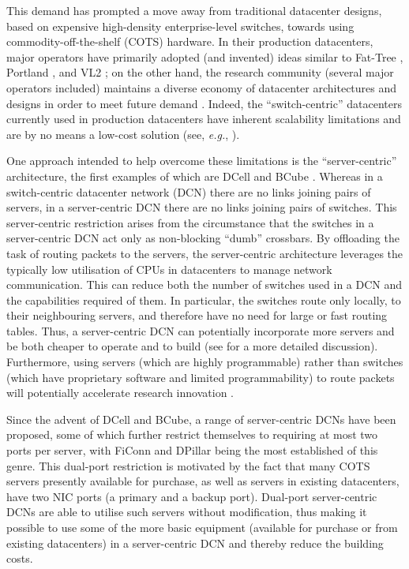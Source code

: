 \documentclass[]{amsart}
\begin{document}
This demand has prompted a move away from traditional datacenter
designs, based on expensive high-density enterprise-level switches,
towards using commodity-off-the-shelf (COTS) hardware.  In their
production datacenters, major operators have primarily adopted (and
invented) ideas similar to Fat-Tree \cite{Al-FaresLoukissasVahdat2008}, Portland \cite{Niranjan-MysorePamborisFarrington2009}, and VL2 \cite{GreenbergHamiltonJain2009}; on the other hand, the research
community (several major operators included) maintains a diverse
economy of datacenter architectures and designs in order to meet
future demand
\cite{HamedazimiQaziGupta2014,LiuGaoWong2014a,GuoWuTan2008, FarringtonPorterRadhakrishnan2010,QuFangZhang2015,SinglaHongPopa2012}.
Indeed, the ``switch-centric'' datacenters currently used in
production datacenters have inherent scalability limitations and are
by no means a low-cost solution (see, \emph{e.g.}, 
\cite{GuoWuTan2008,LiuMuppalaVeeraraghavan2013, GuoChenLi2013,ChenGaoChen2016}).

One approach intended to help overcome these limitations is the
``server-centric'' architecture, the first examples of which are DCell
\cite{GuoWuTan2008} and BCube \cite{GuoLuLi2009}.  Whereas in a switch-centric datacenter network (DCN) there are no links joining pairs of servers, in a server-centric DCN there are no links joining pairs of switches. This server-centric restriction arises from the circumstance that the switches in a server-centric DCN act only as non-blocking ``dumb'' crossbars.  By offloading the
task of routing packets to the servers, the server-centric architecture leverages the
typically low utilisation of CPUs in datacenters to manage network
communication.  This can reduce both the number of switches used in a
DCN and the capabilities required of them.  In particular, the
switches route only locally, to their neighbouring servers, and
therefore have no need for large or fast routing tables.  Thus, a
server-centric DCN can potentially incorporate more servers and be both cheaper to
operate and to build (see \cite{PopaRatnasamyIannaccone2010} for a
more detailed discussion).  Furthermore, using servers (which are highly
programmable) rather than switches (which have
proprietary software and limited programmability) to route packets will potentially
accelerate research innovation \cite{LiGuoYang2014}. 

Since the advent of DCell and BCube, a range of server-centric DCNs have been proposed, some of which further restrict themselves to
requiring at most two ports per server, with FiConn \cite{LiGuoWu2011} and DPillar \cite{LiaoYinYin2012} being the most established of this genre. This dual-port restriction is motivated by the fact that many COTS
servers presently available for purchase, as well as servers in
existing datacenters, have two NIC ports (a primary and a backup port).
Dual-port server-centric DCNs are able to utilise such servers without
modification, thus making it possible to use some of the more basic
equipment (available for purchase or from existing datacenters) in a
server-centric DCN and thereby reduce the building costs. 
\end{document}
